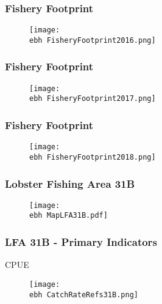 \documentclass{beamer}
\newcommand{\ebh}{\string~/bio.data/bio.lobster/figures/Assessment/LFA2732/} %
\begin{document}
\begin{frame}
\frametitle{Fishery Footprint}
\begin{figure}
        \begin{center}
            \texttt{[image: \\ebh FisheryFootprint2016.png]}
        \end{center}
    \end{figure}
\end{frame}




\begin{frame}
\frametitle{Fishery Footprint}
\begin{figure}
        \begin{center}
            \texttt{[image: \\ebh FisheryFootprint2017.png]}
        \end{center}
    \end{figure}
\end{frame}




\begin{frame}
\frametitle{Fishery Footprint}
\begin{figure}
        \begin{center}
            \texttt{[image: \\ebh FisheryFootprint2018.png]}
        \end{center}
    \end{figure}
\end{frame}







\begin{frame}
\frametitle{Lobster Fishing Area 31B}
\begin{figure}
        \begin{center}
            \texttt{[image: \\ebh MapLFA31B.pdf]}
        \end{center}
    \end{figure}
\end{frame}


\begin{frame}
\frametitle{LFA 31B - Primary Indicators}
CPUE
\begin{figure}
        \begin{center}
            \texttt{[image: \\ebh CatchRateRefs31B.png]}
        \end{center}
    \end{figure}
\end{frame}
\end{document}
